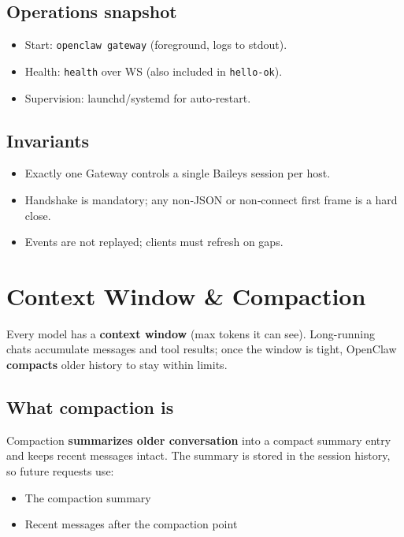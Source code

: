 \subsection{Operations snapshot}


\begin{itemize}
  \item Start: \texttt{openclaw gateway} (foreground, logs to stdout).
  \item Health: \texttt{health} over WS (also included in \texttt{hello-ok}).
  \item Supervision: launchd/systemd for auto‑restart.
\end{itemize}


\subsection{Invariants}


\begin{itemize}
  \item Exactly one Gateway controls a single Baileys session per host.
  \item Handshake is mandatory; any non‑JSON or non‑connect first frame is a hard close.
  \item Events are not replayed; clients must refresh on gaps.
\end{itemize}



\clearpage

\section{Context Window \& Compaction}


Every model has a \textbf{context window} (max tokens it can see). Long-running chats accumulate messages and tool results; once the window is tight, OpenClaw \textbf{compacts} older history to stay within limits.

\subsection{What compaction is}


Compaction \textbf{summarizes older conversation} into a compact summary entry and keeps recent messages intact. The summary is stored in the session history, so future requests use:

\begin{itemize}
  \item The compaction summary
  \item Recent messages after the compaction point
\end{itemize}



